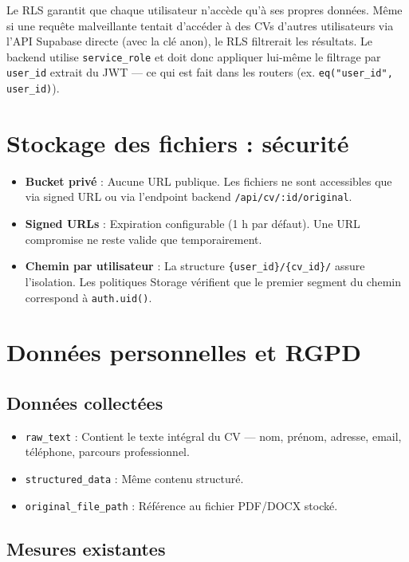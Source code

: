 \documentclass[11pt,a4paper]{report}
\begin{document}
Le RLS garantit que chaque utilisateur n'accède qu'à ses propres données. Même si une requête malveillante tentait d'accéder à des CVs d'autres utilisateurs via l'API Supabase directe (avec la clé anon), le RLS filtrerait les résultats. Le backend utilise \texttt{service\_role} et doit donc appliquer lui-même le filtrage par \texttt{user\_id} extrait du JWT — ce qui est fait dans les routers (ex. \texttt{eq("user\_id", user\_id)}).

\section{Stockage des fichiers : sécurité}

\begin{itemize}[leftmargin=*]
  \item \textbf{Bucket privé} : Aucune URL publique. Les fichiers ne sont accessibles que via signed URL ou via l'endpoint backend \texttt{/api/cv/:id/original}.
  \item \textbf{Signed URLs} : Expiration configurable (1 h par défaut). Une URL compromise ne reste valide que temporairement.
  \item \textbf{Chemin par utilisateur} : La structure \texttt{\{user\_id\}/\{cv\_id\}/} assure l'isolation. Les politiques Storage vérifient que le premier segment du chemin correspond à \texttt{auth.uid()}.
\end{itemize}

\section{Données personnelles et RGPD}

\subsection{Données collectées}

\begin{itemize}[leftmargin=*]
  \item \texttt{raw\_text} : Contient le texte intégral du CV — nom, prénom, adresse, email, téléphone, parcours professionnel.
  \item \texttt{structured\_data} : Même contenu structuré.
  \item \texttt{original\_file\_path} : Référence au fichier PDF/DOCX stocké.
\end{itemize}

\subsection{Mesures existantes}
\end{document}
